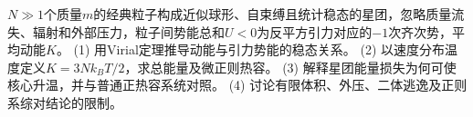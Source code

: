 \(N\gg1\)个质量\(m\)的经典粒子构成近似球形、自束缚且统计稳态的星团，忽略质量流失、辐射和外部压力，粒子间势能总和\(U<0\)为反平方引力对应的\(-1\)次齐次势，平均动能\(K\)。
(1) 用Virial定理推导动能与引力势能的稳态关系。
(2) 以速度分布温度定义\(K=3Nk_BT/2\)，求总能量及微正则热容。
(3) 解释星团能量损失为何可使核心升温，并与普通正热容系统对照。
(4) 讨论有限体积、外压、二体逃逸及正则系综对结论的限制。
